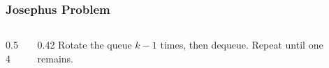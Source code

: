 \documentclass[aspectratio=169,10pt,compress]{beamer}
\begin{document}
\begin{frame}[t,fragile]\frametitle{Josephus Problem}
  \begin{columns}[T]
    \begin{column}{0.54\textwidth}
    \end{column}
    \begin{column}{0.42\textwidth}
      \small
      Rotate the queue $k-1$ times, then dequeue. Repeat until one remains.
    \end{column}
  \end{columns}
\end{frame}

\begin{frame}[t,fragile]
  \begin{center}
    \vspace{4cm}
  \end{center}
\end{frame}
\end{document}

